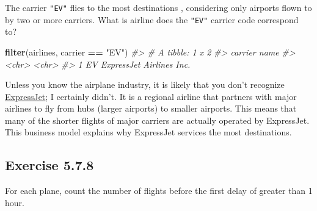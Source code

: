 \documentclass[]{book}
\newenvironment{Shaded}{\begin{snugshade}}{\end{snugshade}}
\newcommand{\CommentTok}[1]{\textcolor[rgb]{0.56,0.35,0.01}{\textit{#1}}}
\newcommand{\DataTypeTok}[1]{\textcolor[rgb]{0.13,0.29,0.53}{#1}}
\newcommand{\DecValTok}[1]{\textcolor[rgb]{0.00,0.00,0.81}{#1}}
\newcommand{\KeywordTok}[1]{\textcolor[rgb]{0.13,0.29,0.53}{\textbf{#1}}}
\newcommand{\NormalTok}[1]{#1}
\newcommand{\OperatorTok}[1]{\textcolor[rgb]{0.81,0.36,0.00}{\textbf{#1}}}
\newcommand{\OtherTok}[1]{\textcolor[rgb]{0.56,0.35,0.01}{#1}}
\newcommand{\StringTok}[1]{\textcolor[rgb]{0.31,0.60,0.02}{#1}}
\theoremstyle{plain}
\theoremstyle{remark}
\theoremstyle{definition}
\theoremstyle{definition}
\theoremstyle{definition}
\theoremstyle{remark}
\begin{document}
The carrier \texttt{"EV"} flies to the most destinations , considering
only airports flown to by two or more carriers. What is airline does the
\texttt{"EV"} carrier code correspond to?

\begin{Shaded}
\begin{Highlighting}[]
\KeywordTok{filter}\NormalTok{(airlines, carrier }\OperatorTok{==}\StringTok{ "EV"}\NormalTok{)}
\CommentTok{#> # A tibble: 1 x 2}
\CommentTok{#>   carrier name                    }
\CommentTok{#>   <chr>   <chr>                   }
\CommentTok{#> 1 EV      ExpressJet Airlines Inc.}
\end{Highlighting}
\end{Shaded}

Unless you know the airplane industry, it is likely that you don't
recognize \href{https://en.wikipedia.org/wiki/ExpressJet}{ExpressJet}; I
certainly didn't. It is a regional airline that partners with major
airlines to fly from hubs (larger airports) to smaller airports. This
means that many of the shorter flights of major carriers are actually
operated by ExpressJet. This business model explains why ExpressJet
services the most destinations.

\hypertarget{exercise-5.7.8}{%
\subsection*{\texorpdfstring{Exercise
{5.7.8}}{Exercise 5.7.8}}\label{exercise-5.7.8}}

For each plane, count the number of flights before the first delay of
greater than 1 hour.

\begin{Shaded}
\end{Shaded}
\end{document}
